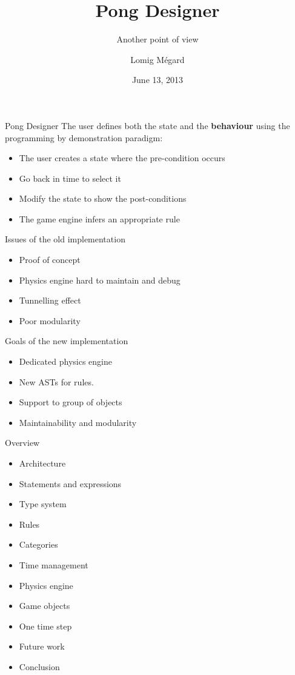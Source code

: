 \documentclass[12pt]{beamer}
\title[Pong Designer]{Pong Designer}
\subtitle{Another point of view}
\author[L. Mégard]{Lomig Mégard}
\institute[EPFL]{
  LARA\\
  Ecole polytechnique fédérale de Lausanne\\[1ex]
  \texttt{lomig.megard@epfl.ch}
}
\date[June 2013]{June 13, 2013}
\begin{document}
\begin{frame}[plain]
\titlepage
\end{frame}

\begin{frame}{Pong Designer}
The user defines both the state and the \textbf{behaviour} using the programming by demonstration paradigm:\\[1em]
\begin{itemize}
\item The user creates a state where the pre-condition occurs
\item Go back in time to select it
\item Modify the state to show the post-conditions
\item The game engine infers an appropriate rule
\end{itemize}
\end{frame}

\begin{frame}{Issues of the old implementation}
\begin{itemize}
\item Proof of concept
\item Physics engine hard to maintain and debug
\item Tunnelling effect
\item Poor modularity
\end{itemize}
\end{frame}

\begin{frame}{Goals of the new implementation}
\begin{itemize}
\item Dedicated physics engine
\item New ASTs for rules.
\item Support to group of objects
\item Maintainability and modularity
\end{itemize}
\end{frame}

\begin{frame}[t]{Overview}
\begin{itemize}
\item Architecture
\item Statements and expressions
\item Type system
\item Rules
\item Categories
\item Time management
\item Physics engine
\item Game objects
\item One time step
\item Future work
\item Conclusion
\end{itemize}
\end{frame}
\end{document}
